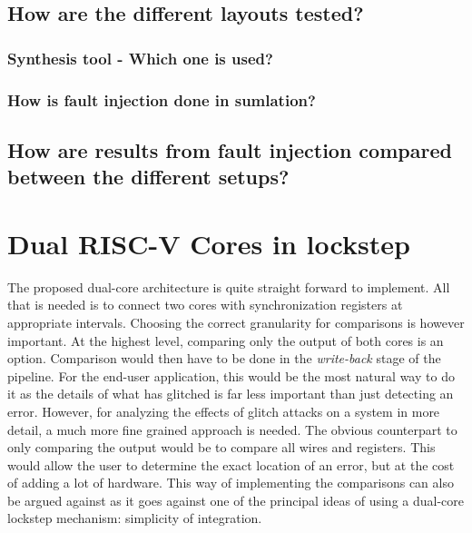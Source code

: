 \subsection{How are the different layouts tested?}
\subsubsection{Synthesis tool - Which one is used?}
\subsubsection{How is fault injection done in sumlation?}
\subsection{How are results from fault injection compared between the different setups?}

\section{Dual RISC-V Cores in lockstep}
\label{sec:dualcore}

The proposed dual-core architecture is quite straight forward to implement. All that is needed is to connect two cores with synchronization registers at appropriate intervals. Choosing the correct granularity for comparisons is however important. At the highest level, comparing only the output of both cores is an option. Comparison would then have to be done in the \textit{write-back} stage of the pipeline. For the end-user application, this would be the most natural way to do it as the details of what has glitched is far less important than just detecting an error. However, for analyzing the effects of glitch attacks on a system in more detail, a much more fine grained approach is needed. The obvious counterpart to only comparing the output would be to compare all wires and registers. This would allow the user to determine the exact location of an error, but at the cost of adding a lot of hardware. This way of implementing the comparisons can also be argued against as it goes against one of the principal ideas of using a dual-core lockstep mechanism: simplicity of integration. 

